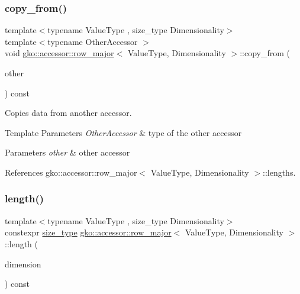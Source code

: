 \subsubsection{\texorpdfstring{copy\+\_\+from()}{copy\_from()}}
{\footnotesize\ttfamily template$<$typename Value\+Type , size\+\_\+type Dimensionality$>$ \\
template$<$typename Other\+Accessor $>$ \\
void \hyperlink{classgko_1_1accessor_1_1row__major}{gko\+::accessor\+::row\+\_\+major}$<$ Value\+Type, Dimensionality $>$\+::copy\+\_\+from (\begin{DoxyParamCaption}\item[{const Other\+Accessor \&}]{other }\end{DoxyParamCaption}) const}



Copies data from another accessor. 


\begin{DoxyTemplParams}{Template Parameters}
{\em Other\+Accessor} & type of the other accessor\\
\hline
\end{DoxyTemplParams}

\begin{DoxyParams}{Parameters}
{\em other} & other accessor \\
\hline
\end{DoxyParams}


References gko\+::accessor\+::row\+\_\+major$<$ Value\+Type, Dimensionality $>$\+::lengths.

\mbox{\label{classgko_1_1accessor_1_1row__major_a438bb22bf86a33db403119bcb914dacc}} 
\subsubsection{\texorpdfstring{length()}{length()}}
{\footnotesize\ttfamily template$<$typename Value\+Type , size\+\_\+type Dimensionality$>$ \\
constexpr \hyperlink{namespacegko_a6e5c95df0ae4e47aab2f604a22d98ee7}{size\+\_\+type} \hyperlink{classgko_1_1accessor_1_1row__major}{gko\+::accessor\+::row\+\_\+major}$<$ Value\+Type, Dimensionality $>$\+::length (\begin{DoxyParamCaption}\item[{\hyperlink{namespacegko_a6e5c95df0ae4e47aab2f604a22d98ee7}{size\+\_\+type}}]{dimension }\end{DoxyParamCaption}) const}



